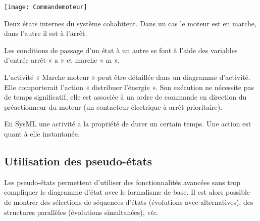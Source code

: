 %



\begin{marginfigure}
\texttt{[image: Commandemoteur]}
\end{marginfigure}

%
\begin{exemple}
Deux états internes du système cohabitent. Dans un cas le moteur est en marche, dans l’autre il est à l’arrêt.

Les conditions de passage d’un état à un autre se font à l’aide des variables d’entrée arrêt « a » et marche « m ».

L’activité « Marche moteur » peut être détaillée dans un diagramme d’activité. Elle comporterait l’action « distribuer l’énergie ». Son exécution ne nécessite pas de temps significatif, elle est associée à un ordre de commande en direction du préactionneur du moteur (un contacteur électrique à arrêt prioritaire).
\end{exemple}


\begin{defi}
En SysML une activité a la propriété de durer un certain temps. Une action est quant à elle instantanée. 
\end{defi}
\subsection{Utilisation des pseudo-états}


\begin{defi}
Les pseudo-états permettent d’utiliser des fonctionnalités avancées sans trop compliquer le diagramme d’état avec le formalisme de base.
Il est alors possible de montrer des sélections de séquences d’états (évolutions avec alternatives), des structures parallèles (évolutions simultanées), \textit{etc}.
\end{defi}

